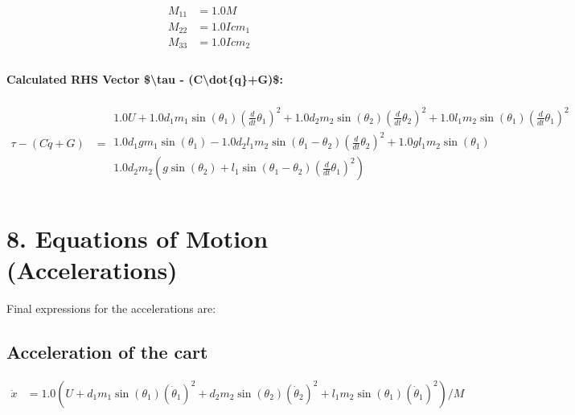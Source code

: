 \documentclass{article}%
\begin{document}
%
\begin{align*}%
M_{11} &= 1.0 M \\%
M_{22} &= 1.0 Icm_{1} \\%
M_{33} &= 1.0 Icm_{2} \\%
\end{align*}%
\vspace{1em}%
\paragraph{\textbf{Calculated RHS Vector \$\textbackslash{}tau {-} (C\textbackslash{}dot\{q\}+G)\$:}}%
\label{para:textbfCalculatedRHSVectortextbackslashtau{-}(Ctextbackslashdotq+G)}%

%
\begin{align*}%
\tau - (C\dot{q}+G) &= \displaystyle \begin{matrix}1.0 U + 1.0 d_{1} m_{1} \sin(\theta_1 ) \left(\frac{d}{d t} \theta_1\right)^{2} + 1.0 d_{2} m_{2} \sin(\theta_2 ) \left(\frac{d}{d t} \theta_2\right)^{2} + 1.0 l_{1} m_{2} \sin(\theta_1 ) \left(\frac{d}{d t} \theta_1\right)^{2}\\1.0 d_{1} g m_{1} \sin(\theta_1 ) - 1.0 d_{2} l_{1} m_{2} \sin(\theta_1 - \theta_2 ) \left(\frac{d}{d t} \theta_2\right)^{2} + 1.0 g l_{1} m_{2} \sin(\theta_1 )\\1.0 d_{2} m_{2} \left(g \sin(\theta_2 ) + l_{1} \sin(\theta_1 - \theta_2 ) \left(\frac{d}{d t} \theta_1\right)^{2}\right)\end{matrix} \\%
\end{align*}

%
\section{8. Equations of Motion (Accelerations)}%
\label{sec:8.EquationsofMotion(Accelerations)}%
Final expressions for the accelerations are:%
\subsection{Acceleration of the cart}%
\label{subsec:Accelerationofthecart}%
\begin{align*}%
\ddot{x} &= \displaystyle 1.0 \left(U + d_{1} m_{1} \sin(\theta_1 ) \left(\dot{\theta}_{1}\right)^{2} + d_{2} m_{2} \sin(\theta_2 ) \left(\dot{\theta}_{2}\right)^{2} + l_{1} m_{2} \sin(\theta_1 ) \left(\dot{\theta}_{1}\right)^{2}\right) / M \\%
\end{align*}
\end{document}
